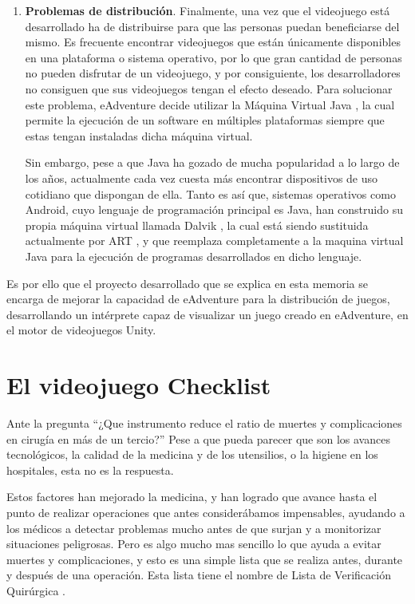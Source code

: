 \begin{enumerate}
	\item \textbf{Problemas de distribución}. Finalmente, una vez que el videojuego está desarrollado ha de distribuirse para que las personas puedan beneficiarse del mismo. Es frecuente encontrar videojuegos que están únicamente disponibles en una plataforma o sistema operativo, por lo que gran cantidad de personas no pueden disfrutar de un videojuego, y por consiguiente, los desarrolladores no consiguen que sus videojuegos tengan el efecto deseado. Para solucionar este problema, eAdventure decide utilizar la Máquina Virtual Java \cite{Lindholm2014}, la cual permite la ejecución de un software en múltiples plataformas siempre que estas tengan instaladas dicha máquina virtual. 
	
	Sin embargo, pese a que Java ha gozado de mucha popularidad a lo largo de los años, actualmente cada vez cuesta más encontrar dispositivos de uso cotidiano que dispongan de ella. Tanto es así que, sistemas operativos como Android, cuyo lenguaje de programación principal es Java, han construido su propia máquina virtual llamada Dalvik \cite{Report2009}, la cual está siendo sustituida actualmente por ART \cite{Levin}, y que reemplaza completamente a la maquina virtual Java para la ejecución de programas desarrollados en dicho lenguaje.
\end{enumerate}

Es por ello que el proyecto desarrollado que se explica en esta memoria se encarga de mejorar la capacidad de eAdventure para la distribución de juegos, desarrollando un intérprete capaz de visualizar un juego creado en eAdventure, en el motor de videojuegos Unity. 

\section{El videojuego Checklist}
\label{checklist}

Ante la pregunta ``¿Que instrumento reduce el ratio de muertes y complicaciones en cirugía en más de un tercio?'' Pese a que pueda parecer que son los avances tecnológicos, la calidad de la medicina y de los utensilios, o la higiene en los hospitales, esta no es la respuesta.

Estos factores han mejorado la medicina, y han logrado que avance hasta el punto de realizar operaciones que antes considerábamos impensables, ayudando a los médicos a detectar problemas mucho antes de que surjan y a monitorizar situaciones peligrosas. Pero es algo mucho mas sencillo lo que ayuda a evitar muertes y complicaciones, y esto es una simple lista que se realiza antes, durante y después de una operación. Esta lista tiene el nombre de Lista de Verificación Quirúrgica \cite{baltaslide}.

